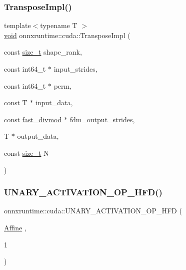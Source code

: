 \mbox{\label{namespaceonnxruntime_1_1cuda_af64c8129bc67a4b75fe313352c808808}} 
\subsubsection{\texorpdfstring{Transpose\+Impl()}{TransposeImpl()}}
{\footnotesize\ttfamily template$<$typename T $>$ \\
\mbox{\hyperlink{mlasi_8h_a88f941d423cb2a819b70a1358982b1a6}{void}} onnxruntime\+::cuda\+::\+Transpose\+Impl (\begin{DoxyParamCaption}\item[{const \mbox{\hyperlink{mlasi_8h_a503efbc1c6e50825320ad909366b78ab}{size\+\_\+t}}}]{shape\+\_\+rank,  }\item[{const int64\+\_\+t $\ast$}]{input\+\_\+strides,  }\item[{const int64\+\_\+t $\ast$}]{perm,  }\item[{const T $\ast$}]{input\+\_\+data,  }\item[{const \mbox{\hyperlink{classonnxruntime_1_1cuda_1_1fast__divmod}{fast\+\_\+divmod}} $\ast$}]{fdm\+\_\+output\+\_\+strides,  }\item[{T $\ast$}]{output\+\_\+data,  }\item[{const \mbox{\hyperlink{mlasi_8h_a503efbc1c6e50825320ad909366b78ab}{size\+\_\+t}}}]{N }\end{DoxyParamCaption})}

\mbox{\label{namespaceonnxruntime_1_1cuda_a527f8290d15a8af5de399ab37e5e09be}} 
\subsubsection{\texorpdfstring{U\+N\+A\+R\+Y\+\_\+\+A\+C\+T\+I\+V\+A\+T\+I\+O\+N\+\_\+\+O\+P\+\_\+\+H\+F\+D()}{UNARY\_ACTIVATION\_OP\_HFD()}\hspace{0.1cm}{\footnotesize\ttfamily [1/13]}}
{\footnotesize\ttfamily onnxruntime\+::cuda\+::\+U\+N\+A\+R\+Y\+\_\+\+A\+C\+T\+I\+V\+A\+T\+I\+O\+N\+\_\+\+O\+P\+\_\+\+H\+FD (\begin{DoxyParamCaption}\item[{\mbox{\hyperlink{classonnxruntime_1_1cuda_1_1Affine}{Affine}}}]{,  }\item[{1}]{ }\end{DoxyParamCaption})}


